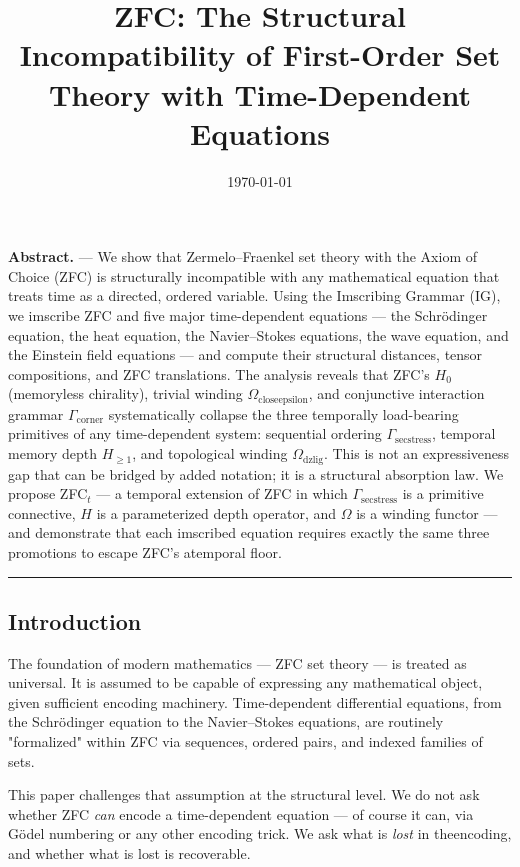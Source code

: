 \documentclass[12pt,a4paper]{article}
\begin{document}
\title{ZFC: The Structural Incompatibility of First-Order Set Theory with Time-Dependent Equations}
\date{\today}

\maketitle

\textbf{Abstract.} --- We show that Zermelo--Fraenkel set theory with the Axiom of Choice (ZFC) is structurally incompatible with any mathematical equation that treats time as a directed, ordered variable. Using the Imscribing Grammar (IG), we imscribe ZFC and five major time-dependent equations --- the Schrödinger equation, the heat equation, the Navier--Stokes equations, the wave equation, and the Einstein field equations --- and compute their structural distances, tensor compositions, and ZFC translations. The analysis reveals that ZFC's $H_0$ (memoryless chirality), trivial winding $\Omega_{\text{closeepsilon}}$, and conjunctive interaction grammar $\Gamma_{\text{corner}}$ systematically collapse the three temporally load-bearing primitives of any time-dependent system: sequential ordering $\Gamma_{\text{secstress}}$, temporal memory depth $H_{\geq 1}$, and topological winding $\Omega_{\text{dzlig}}$. This is not an expressiveness gap that can be bridged by added notation; it is a structural absorption law. We propose ZFC$_t$ --- a temporal extension of ZFC in which $\Gamma_{\text{secstress}}$ is a primitive connective, $H$ is a parameterized depth operator, and $\Omega$ is a winding functor --- and demonstrate that each imscribed equation requires exactly the same three promotions to escape ZFC's atemporal floor.

\begin{center}
\rule{0.5\textwidth}{0.4pt}
\end{center}

\subsection{Introduction}

The foundation of modern mathematics --- ZFC set theory --- is treated as universal. It is assumed to be capable of expressing any mathematical object, given sufficient encoding machinery. Time-dependent differential equations, from the Schrödinger equation to the Navier--Stokes equations, are routinely "formalized" within ZFC via sequences, ordered pairs, and indexed families of sets.

This paper challenges that assumption at the structural level. We do not ask whether ZFC \emph{can} encode a time-dependent equation --- of course it can, via Gödel numbering or any other encoding trick. We ask what is \emph{lost} in theencoding, and whether what is lost is recoverable.
\end{document}

